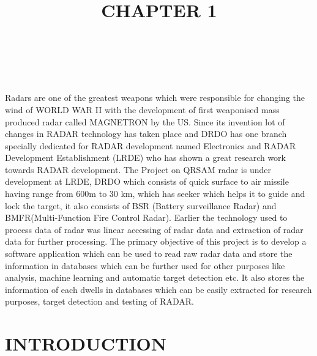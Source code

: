 \documentclass[12pt]{article} %
\begin{document}
\newpage
\thispagestyle{plain}
\section*{\LARGE\bfseries{\\ }}
Radars are one of the greatest weapons which were responsible for changing the wind of WORLD WAR II with the development of first weaponised mass produced radar called MAGNETRON by the US. Since its invention lot of changes in RADAR technology has taken place and DRDO has one branch specially dedicated for RADAR development named Electronics and RADAR Development Establishment (LRDE) who has shown a great research work towards RADAR development. The Project on QRSAM radar is under development at LRDE, DRDO which consists of quick surface to air missile having range from 600m to 30 km, which has seeker which helps it to guide and lock the target, it also consists of BSR (Battery surveillance Radar) and BMFR(Multi-Function Fire Control Radar). Earlier the technology used to process data of radar was linear accessing of radar data and extraction of radar data for further processing. The primary objective of this project is to develop a software application which can be used to read raw radar data and store the information in databases which can be further used for other purposes like analysis, machine learning and automatic target detection etc. It also stores the information of each dwells in databases which can be easily extracted for research purposes, target detection and testing of RADAR.


\newpage
\thispagestyle{plain}

\tableofcontents
\thispagestyle{plain}

\newpage

\listoffigures
\thispagestyle{plain}

\listoftables
\thispagestyle{plain}

\newpage

\title{\textbf{\huge {CHAPTER 1}}}
\maketitle
{}
\setcounter{page}{1}
\section{INTRODUCTION}
\end{document}
